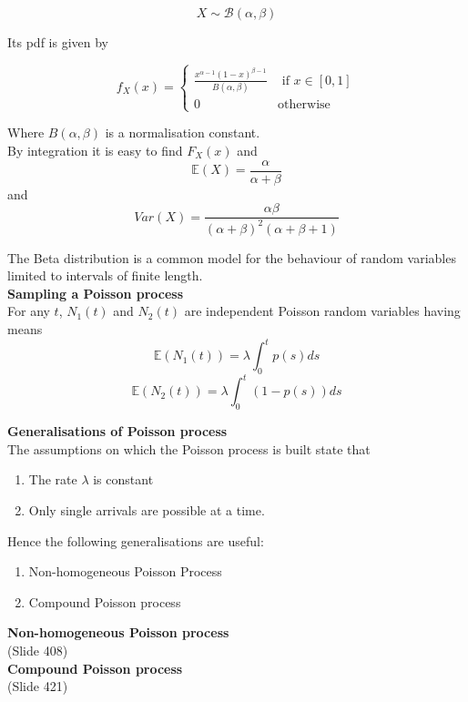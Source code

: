 $$X \sim \mathcal{B}(\alpha, \beta)$$

Its pdf is given by

$$f_X(x) = \begin{cases} \frac{x^{\alpha-1}(1-x)^{\beta-1}}{B(\alpha,\beta)} & \text{ if } x \in [0,1] \\ 0 & \text{otherwise} \end{cases}$$

Where $B(\alpha, \beta)$ is a normalisation constant.\\

By integration it is easy to find $F_X(x)$ and\\
$$\mathbb{E}(X) = \frac{\alpha}{\alpha + \beta} $$
and 
$$Var(X) = \frac{\alpha \beta}{(\alpha + \beta)^2 (\alpha + \beta + 1)}$$

The Beta distribution is a common model for the behaviour of random variables limited to intervals of finite length.\\

\textbf{Sampling a Poisson process}\\
For any $t$, $N_1(t)$ and $N_2(t)$ are independent Poisson random variables having means
$$\mathbb{E}(N_1(t)) = \lambda \int_0^t p(s)ds$$
$$\mathbb{E}(N_2(t)) = \lambda \int_0^t (1-p(s))ds$$

\textbf{Generalisations of Poisson process}\\

The assumptions on which the Poisson process is built state that

\begin{enumerate}
	\item The rate $\lambda$ is constant
	\item Only single arrivals are possible at a time.
\end{enumerate}

Hence the following generalisations are useful:

\begin{enumerate}
	\item Non-homogeneous Poisson Process
	\item Compound Poisson process
\end{enumerate}

\textbf{Non-homogeneous Poisson process}\\
(Slide 408)\\

\textbf{Compound Poisson process}\\
(Slide 421)